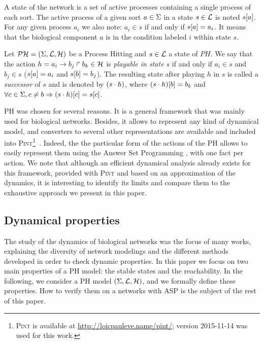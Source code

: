 A state of the network is a set of active processes containing a single process of each sort.
The active process of a given sort $a \in \Sigma$ in a state $s \in \mathcal{L}$
is noted ${s[a]}$.
For any given process $a_i$ we also note: $a_i \in s$ if and only if ${s[a]} = a_i$. It means that the biological component $a$ is in the condition labeled $i$ within state $s$.

\begin{definition} 
\label{def:playableAction}
Let $\mathcal{PH} = (\Sigma,\mathcal{L},\mathcal{H})$ be a Process Hitting and $s \in \mathcal{L}$ a state of $PH$.
We say that the action $h = a_i\rightarrow b_j\Rsh b_k \in \mathcal{H}$
is \emph{playable in state $s$} if and only if
$a_i \in s$ and $b_j \in s$ (\ie ${s[a]} = a_i$ and ${s[b]}=b_j$).
The resulting state after playing $h$ in $s$
is called a \emph{successor} of $s$ and
is denoted by $(s \cdot h)$,
where ${(s \cdot h)[b]} = b_k$ and
$\forall c \in \Sigma, c \neq b \Rightarrow {(s \cdot h)[c]}={s[c]}$.
\end{definition}

PH was chosen for several reasons. It is a general framework that was mainly used for biological networks. Besides, it allows to represent any kind of dynamical model,
and converters to several other representations are available and included into \textsc{Pint}\footnote{\textsc{Pint} is available at \url{http://loicpauleve.name/pint/}; version 2015-11-14 was used for this work.}~\cite{PMR12-MSCS}.
Indeed, the the particular form of the actions of the PH allows
to easily represent them using the Answer Set Programming \cite{Baral03, Vladimir, Glimpse, sureshkumar2006ansprolog},
with one fact per action.
We note that although an efficient dynamical analysis already exists for this framework,
provided with \textsc{Pint} and based on an approximation of the dynamics,
it is interesting to identify its limits
and compare them to the exhaustive approach we present in this paper.

\subsection{Dynamical properties}

The study of the dynamics of biological networks was the focus of many works, explaining the diversity of network modelings and the different methods developed in order to check dynamic properties.
In this paper we focus on two main properties of a PH model: the stable states and the reachability.
In the following, we consider a PH model $(\Sigma,\mathcal{L},\mathcal{H})$,
and we formally define these properties.
How to verify them on a networks with ASP is the subject of the rest of this paper.

